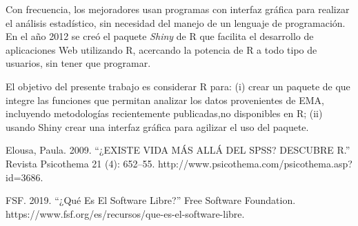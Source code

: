 Con frecuencia, los mejoradores usan programas con interfaz gráfica para realizar el análisis estadístico, sin necesidad del manejo de un lenguaje de programación. En el año 2012 se creó el paquete \emph{Shiny} de R que facilita el desarrollo de aplicaciones Web utilizando R, acercando la potencia de R a todo tipo de usuarios, sin tener que programar.

El objetivo del presente trabajo es considerar R para: (i) crear un paquete de que integre las funciones que permitan analizar los datos provenientes de EMA, incluyendo metodologías recientemente publicadas,no disponibles en R; (ii) usando Shiny crear una interfaz gráfica para agilizar el uso del paquete.



Elousa, Paula. 2009. “¿EXISTE VIDA MÁS ALLÁ DEL SPSS? DESCUBRE R.” Revista Psicothema 21 (4): 652–55. http://www.psicothema.com/psicothema.asp?id=3686.

FSF. 2019. “¿Qué Es El Software Libre?” Free Software Foundation. https://www.fsf.org/es/recursos/que-es-el-software-libre.